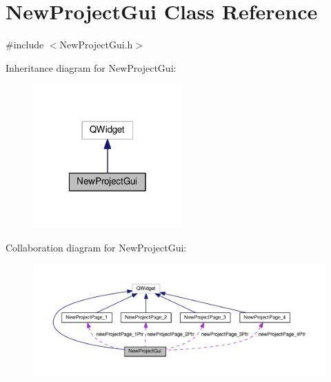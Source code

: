 \hypertarget{class_new_project_gui}{\section{New\-Project\-Gui Class Reference}
\label{class_new_project_gui}
}


{\ttfamily \#include $<$New\-Project\-Gui.\-h$>$}



Inheritance diagram for New\-Project\-Gui\-:\nopagebreak
\begin{figure}[H]
\begin{center}
\leavevmode
\includegraphics[width=162pt]{class_new_project_gui__inherit__graph}
\end{center}
\end{figure}


Collaboration diagram for New\-Project\-Gui\-:\nopagebreak
\begin{figure}[H]
\begin{center}
\leavevmode
\includegraphics[width=350pt]{class_new_project_gui__coll__graph}
\end{center}
\end{figure}
